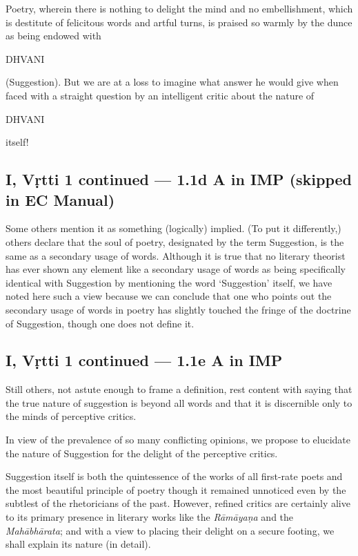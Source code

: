 \documentclass[12pt]{book}
\begin{document}
\begin{em}
Poetry, wherein there is nothing to delight the mind and no
embellishment, which is destitute of felicitous words and
artful turns, is praised so warmly by the dunce as being
endowed with 
\end{em}
DHVANI
\begin{em}
(Suggestion). But we are at a loss to
imagine what answer he would give when faced with
a straight question by an intelligent critic about the nature of
\end{em}
DHVANI
\begin{em}
itself!
\end{em}


\subsection{I, Vṛtti 1 continued --- 1.1d A in IMP (skipped in EC Manual)}

Some others mention it as something (logically) implied.
(To put it differently,) others declare that the soul of poetry,
designated by the term Suggestion, is the same as a secondary
usage of words. Although it is true that no literary theorist has
ever shown any element like a secondary usage of words as being
specifically identical with Suggestion by mentioning the word
`Suggestion' itself, we have noted here such a view because we
can conclude that one who points out the secondary usage of
words in poetry has slightly touched the fringe of the doctrine
of Suggestion, though one does not define it.


\subsection{I, Vṛtti 1 continued --- 1.1e A in IMP}

Still others, not astute enough to frame a definition, rest
content with saying that the true nature of suggestion is beyond
all words and that it is discernible only to the minds of
perceptive critics.

In view of the prevalence of so many conflicting opinions,
we propose to elucidate the nature of Suggestion for the delight
of the perceptive critics.

Suggestion itself is both the quintessence of the works of all
first-rate poets and the most beautiful principle of poetry though it
remained unnoticed even by the subtlest of the rhetoricians
of the past. However, refined critics are certainly alive to its
primary presence in literary works like the \textit{Rāmāyaṇa} and the
\textit{Mahābhārata}; and with a view to placing their delight on a
secure footing, we shall explain its nature (in detail).
\end{document}
